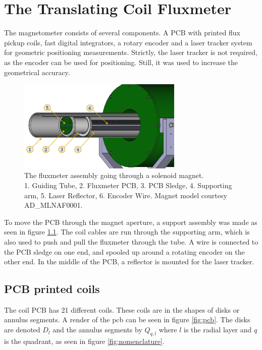 \chapter{The Translating Coil Fluxmeter}
The magnetometer consists of several components. A PCB with 
printed flux pickup coils, fast digital integrators, a rotary
encoder and a laser tracker system for geometric positioning measurements.
Strictly, the laser tracker is not required, as the encoder can be used
for positioning. Still, it was used to increase
the geometrical accuracy.

\begin{figure}[!h]
    \centering
    \includegraphics[width=0.7\textwidth]{figs/elena}
    \caption{The fluxmeter assembly going through a solenoid magnet. \\
    1. Guiding Tube, 2. Fluxmeter PCB, 3. PCB Sledge, 4. Supporting arm, 
    5. Laser Reflector, 6. Encoder Wire.
    Magnet model courtesy {AD_MLNAF0001}.}
    \label{fig:elena}
\end{figure}

To move the PCB through the magnet aperture, a support assembly was made as
seen in figure \ref{fig:elena}. The coil cables are run through the supporting
arm, which is also used to push and pull the fluxmeter through the tube. A 
wire is connected to the PCB sledge on one end, and spooled up around
a rotating encoder on the other end. In the middle of the PCB, a 
reflector is mounted for the laser tracker.

\section{PCB printed coils}
The coil PCB has 21 different coils.
These coils are in the shapes of disks or annulus segments.
A render of the pcb can be seen in figure
\ref{fig:pcb}. The disks are denoted $D_l$ and the 
annulus segments by $Q_{q, l}$ where $l$ is the radial layer and 
$q$ is the quadrant, as seen in figure \ref{fig:nomenclature}.


